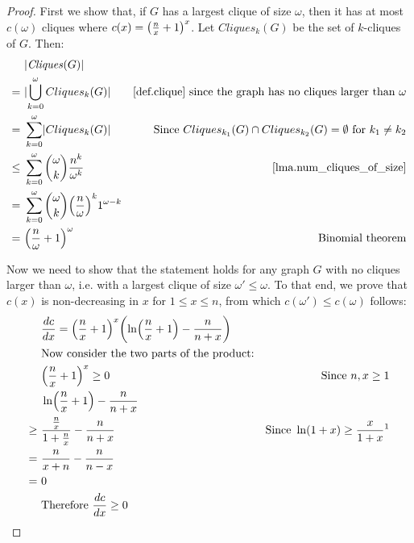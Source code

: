 \documentclass{report}
\DeclarePairedDelimiter{\abs}{\lvert}{\rvert}
\DeclarePairedDelimiter{\bracks}{(}{)}
\theoremstyle{definition}
\begin{document}
\begin{proof}
First we show that, if $G$ has a largest clique of size $\omega$, then it has at most
$c(\omega)$ cliques where $c(x) = \bracks*{\frac{n}{x} + 1}^x$. Let $Cliques_k(G)$ be
the set of $k$-cliques of $G$. Then:
\begin{align*}
& \abs{\mathit{Cliques}(G)} \\
= \ & \abs{\bigcup_{k = 0}^\omega Cliques_k(G)}
& \text{\cref{def.clique} since the graph has no cliques larger than } \omega \\
= \ & \sum_{k = 0}^\omega \abs{Cliques_k(G)}
& \text{Since } Cliques_{k_1}(G) \cap Cliques_{k_2}(G) = \emptyset
\text{ for } k_1 \neq k_2 \\
\leq \ & \sum_{k = 0}^\omega \binom{\omega}{k} \frac{n^k}{\omega^k}
& \text{\cref{lma.num_cliques_of_size}} \\
= \ & \sum_{k = 0}^\omega \binom{\omega}{k}
\bracks*{\frac{n}{\omega}}^k 1^{\omega - k} \\
= \ & \bracks*{\frac{n}{\omega} + 1}^{\omega}
& \text{Binomial theorem}
\end{align*}

Now we need to show that the statement holds for any graph $G$ with no cliques
larger than $\omega$, i.e. with a largest clique of size $\omega' \leq \omega$.
To that end, we prove that $c(x)$ is non-decreasing in $x$ for $1 \leq x \leq n$,
from which $c(\omega') \leq c(\omega)$ follows:
\begin{align*}
& \frac{d c}{d x} = \bracks*{\frac{n}{x} + 1}^x
\bracks*{\ln \bracks*{\frac{n}{x} + 1} - \frac{n}{n + x}} \\
& \text{Now consider the two parts of the product:} \\
& \bracks*{\frac{n}{x} + 1}^x \geq 0
& \text{Since } n, x \geq 1 \\
& \ln \bracks*{\frac{n}{x} + 1} - \frac{n}{n + x} \\
\geq \ & \frac{\frac{n}{x}}{1 + \frac{n}{x}} - \frac{n}{n + x}
& \text{Since } \ln (1 + x) \geq \frac{x}{1 + x} \text{\footnotemark} \\
= \ & \frac{n}{x + n} - \frac{n}{n - x} \\
= \ & 0 \\
& \text{Therefore } \frac{d c}{d x} \geq 0
\end{align*}


\end{proof}
\end{document}
